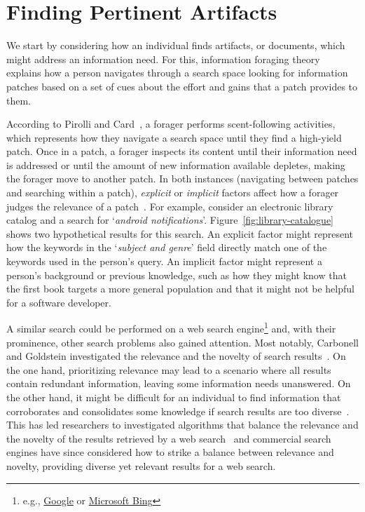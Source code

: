 


\section{Finding Pertinent Artifacts}
\label{cp2:searching}


We start by considering how an individual finds 
artifacts, or documents, which might 
address an information need. 
For this, information foraging theory~\cite{Pirolli1999} explains how a person navigates through  
a search space looking for information patches  based on 
a set of cues about the effort and gains that a patch provides to them.


According to Pirolli and Card~\cite{Pirolli1999}, a forager performs scent-following activities, which represents 
how they navigate a search space until they find a high-yield patch. 
Once in a patch, a forager inspects its content until their information need is addressed or until the amount of new information available depletes, making the forager move to another patch. 
In both instances (navigating between patches and searching within a patch), \textit{explicit} or \textit{implicit} factors affect how a forager judges the relevance of a patch~\cite{saracevic1975}.
For example,
consider an electronic library catalog and a search for `\textit{android notifications}'.
Figure~\ref{fig:library-catalogue} shows two hypothetical results for this search. %
An explicit factor might represent how the keywords in the `\textit{subject and genre}' field
directly match one of the keywords used in the person's query. An implicit factor might represent 
a person's background or previous knowledge, such as how 
they might know that the first book targets a more general population and 
that it might not be helpful for a software developer.







A similar search could be performed on a web search engine\footnote{e.g., \href{https://www.google.com/}{Google} or \href{https://www.bing.com/}{Microsoft Bing}}
and, with their prominence, other search problems also gained attention.
Most notably,  Carbonell and Goldstein investigated the relevance and the novelty of search results~\cite{Carbonell1998}.
On the one hand, prioritizing relevance may lead to a scenario where all results contain redundant information, leaving some information needs unanswered. 
On the other hand, it might be difficult for an individual 
to find information that corroborates and consolidates some knowledge if search results are too diverse~\cite{clark2013relevance}.  
This has led researchers to investigated 
algorithms that balance the relevance and the novelty of the results retrieved
by a web search~\cite{najork2001, rafiei2010, vieira2011}
and commercial search engines have since considered how to strike a balance
between relevance and novelty, providing diverse  
yet relevant results for a web search.



